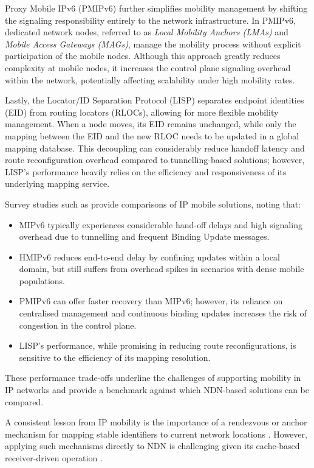 Proxy Mobile IPv6 (PMIPv6) \cite{Gundavelli-08} further simplifies mobility management by shifting the signaling responsibility entirely to the network infrastructure. In PMIPv6, dedicated network nodes, referred to as \emph{Local Mobility Anchors (LMAs)} and \emph{Mobile Access Gateways (MAGs)}, manage the mobility process without explicit participation of the mobile nodes. Although this approach greatly reduces complexity at mobile nodes, it increases the control plane signaling overhead within the network, potentially affecting scalability under high mobility rates.

Lastly, the Locator/ID Separation Protocol (LISP) \cite{Farinacci-13} separates endpoint identities (EID) from routing locators (RLOCs), allowing for more flexible mobility management. When a node moves, its EID remains unchanged, while only the mapping between the EID and the new RLOC needs to be updated in a global mapping database. This decoupling can considerably reduce handoff latency and route reconfiguration overhead compared to tunnelling-based solutions; however, LISP’s performance heavily relies on the efficiency and responsiveness of its underlying mapping service.

Survey studies such as \cite{Zhu-11} provide comparisons of IP mobile solutions, noting that:
\begin{itemize}
    \item MIPv6 typically experiences considerable hand-off delays and high signaling overhead due to tunnelling and frequent Binding Update messages.
    \item HMIPv6 reduces end-to-end delay by confining updates within a local domain, but still suffers from overhead spikes in scenarios with dense mobile populations.
    \item PMIPv6 can offer faster recovery than MIPv6; however, its reliance on centralised management and continuous binding updates increases the risk of congestion in the control plane.
    \item LISP's performance, while promising in reducing route reconfigurations, is sensitive to the efficiency of its mapping resolution.
\end{itemize}

These performance trade-offs underline the challenges of supporting mobility in IP networks and provide a benchmark against which NDN-based solutions can be compared.

A consistent lesson from IP mobility is the importance of a rendezvous or anchor mechanism for mapping stable identifiers to current network locations \cite{Zhu-11}. However, applying such mechanisms directly to NDN is challenging given its cache-based receiver-driven operation \cite{Lee-12}.

